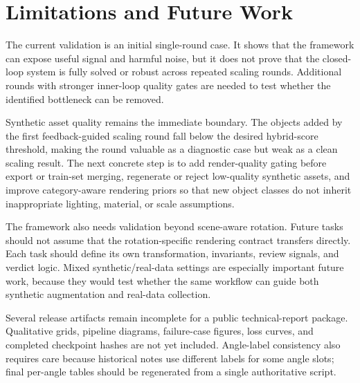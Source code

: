 \section{Limitations and Future Work}
\label{sec:limitations}

The current validation is an initial single-round \inspect{} case. It shows that the framework can expose useful signal and harmful noise, but it does not prove that the closed-loop system is fully solved or robust across repeated scaling rounds. Additional rounds with stronger inner-loop quality gates are needed to test whether the identified bottleneck can be removed.

Synthetic asset quality remains the immediate boundary. The objects added by the first feedback-guided scaling round fall below the desired hybrid-score threshold, making the round valuable as a diagnostic case but weak as a clean scaling result. The next concrete step is to add render-quality gating before export or train-set merging, regenerate or reject low-quality synthetic assets, and improve category-aware rendering priors so that new object classes do not inherit inappropriate lighting, material, or scale assumptions.

The framework also needs validation beyond scene-aware rotation. Future tasks should not assume that the rotation-specific rendering contract transfers directly. Each task should define its own transformation, invariants, review signals, and verdict logic. Mixed synthetic/real-data settings are especially important future work, because they would test whether the same workflow can guide both synthetic augmentation and real-data collection.

Several release artifacts remain incomplete for a public technical-report package. Qualitative grids, pipeline diagrams, failure-case figures, loss curves, and completed checkpoint hashes are not yet included. Angle-label consistency also requires care because historical notes use different labels for some angle slots; final per-angle tables should be regenerated from a single authoritative script.
